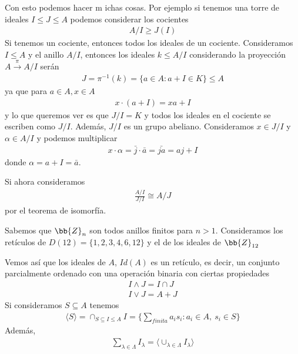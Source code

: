 Con esto podemos hacer m ichas cosas. Por ejemplo si tenemos una torre de ideales $I \leq J \leq A$ podemos considerar los cocientes
\begin{gather*}
    A/I \geq J(I)
\end{gather*}
Si tenemos un cociente, entonces todos los ideales de un cociente. Consideramos $I\leq A$ y el anillo $A/I$, entonces los ideales $k\leq A/I$ considerando la proyección $A \overset{\pi}{\to} A/I$ serán
\begin{gather*}
    J=\pi^{-1}(k) = \{a \in A : a+I \in K\} \leq A
\end{gather*}
ya que para $a\in A, x\in A$
\begin{gather*}
    x \cdot(a+I) = xa + I
\end{gather*}
y lo que queremos ver es que $J/I = K$ y todos los ideales en el cociente se escriben como $J/I$. Además, $J/I$ es un grupo abeliano. Consideramos $x \in J/I$ y $\alpha \in A/I$ y podemos multiplicar
\begin{gather*}
    x\cdot \alpha = \bar{j} \cdot \bar{a} = \bar{ja} = aj + I
\end{gather*}
donde $\alpha = a + I = \bar{a}$. 

Si ahora consideramos 
\begin{gather*}
    \frac{A/I}{J/I} \cong A/J
\end{gather*}
por el teorema de isomorfía.



Sabemos que $\bb{Z}_n$ son todos anillos finitos para $n>1$. Consideramos los retículos de $D(12) = \{1,2,3,4,6,12\}$ y el de los ideales de $\bb{Z}_{12}$ %

Vemos así que los ideales de $A$, $Id(A)$ es un retículo, es decir, un conjunto parcialmente ordenado con una operación binaria con ciertas propiedades %
\begin{gather*}
    I \wedge J = I \cap J\\
    I \vee J = A + J
\end{gather*}
Si consideramos $S \subseteq A$ tenemos 
\begin{gather*}
    \langle S \rangle = \cap_{S \subseteq I \leq A} I = \{\sum_{finita} a_is_i : a_i\in A,\ s_i\in S\}
\end{gather*}
Además,
\begin{gather*}
    \sum_{\lambda \in \Lambda} I_\lambda = \langle \cup_{\lambda \in \Lambda} I_\lambda \rangle
\end{gather*}

